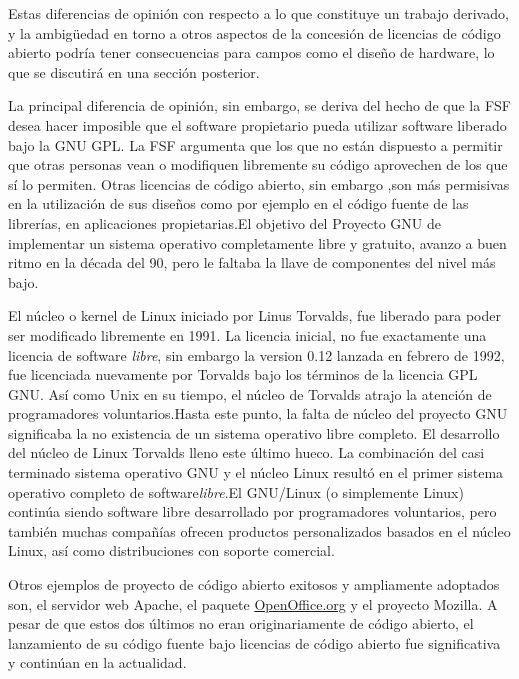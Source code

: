 	Estas diferencias de opinión con respecto a lo que constituye un trabajo derivado, y la ambigüedad en torno a otros
	aspectos de la concesión de licencias de código abierto podría tener consecuencias para campos como el diseño de hardware, lo que se discutirá en una
	sección posterior.


	 La principal diferencia de opinión, sin embargo, se deriva del hecho de que la FSF desea hacer imposible que el software
	propietario  pueda utilizar software liberado bajo la GNU GPL. La FSF argumenta que los que no están dispuesto a permitir que otras personas vean o
	modifiquen libremente su código aprovechen de los que sí lo permiten. Otras licencias de código abierto, sin embargo ,son más permisivas en la
	utilización de sus diseños como por ejemplo en el código fuente de las librerías, en aplicaciones propietarias.El objetivo del Proyecto GNU de implementar 
	un sistema operativo completamente libre y gratuito, avanzo a buen ritmo en la década del 90, pero le faltaba la llave de componentes del nivel más bajo.


	El núcleo o kernel de Linux iniciado por Linus Torvalds, fue liberado para poder ser modificado libremente en 1991. La licencia inicial, no fue exactamente una
	licencia de software \textit{libre}, sin embargo la version 0.12 lanzada en febrero de 1992, fue licenciada nuevamente por Torvalds bajo los términos de la
	licencia GPL GNU. Así como Unix en su tiempo, el núcleo de Torvalds atrajo la atención de programadores voluntarios.Hasta este punto, la falta de núcleo del proyecto GNU				significaba la no existencia de un sistema operativo libre completo. El desarrollo del núcleo de					
	Linux Torvalds lleno este último hueco. La combinación del casi terminado sistema operativo GNU y el núcleo Linux resultó en el primer sistema
	operativo completo de software\textit{libre}.El GNU/Linux (o simplemente Linux) continúa siendo software libre desarrollado por programadores voluntarios, pero también 				muchas compañías ofrecen productos personalizados basados en el núcleo Linux, así como distribuciones con soporte comercial.


	Otros ejemplos de proyecto de código abierto exitosos y ampliamente adoptados son, el servidor web Apache, el paquete \url{OpenOffice.org} y el proyecto Mozilla. A pesar de 			que estos dos últimos no eran originariamente de código abierto, el lanzamiento de su código fuente bajo licencias de código abierto fue significativa y continúan en la 					actualidad.
	
	

